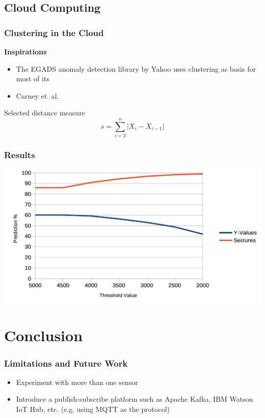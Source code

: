\documentclass[xelatex,usenames,dvipsnames]{beamer}
\begin{document}
  \subsection{Cloud Computing}
  \begin{frame}
    \frametitle{Clustering in the Cloud}
    \textbf{Inspirations}
    \begin{itemize}
      \item The \textsc{EGADS} anomaly detection library by Yahoo\cite{egads} uses clustering as basis for most of its
      \item Carney et. al.\cite{Carney2011}
    \end{itemize}
  
    \begin{exampleblock}{Selected distance measure}
      \begin{equation*}
        s = \sum_{i=2}^{n}{\left|X_i - X_{i-1}\right|}
      \end{equation*}
    \end{exampleblock}
  
  \end{frame}


  \begin{frame}[standout]
    \frametitle{Results}
  
    \includegraphics[width = \textwidth]{figs/Threshold.png}
    
  
  \end{frame}


  \section{Conclusion}
  \begin{frame}
    \frametitle{Limitations and Future Work}
    \begin{itemize}
      \item Experiment with more than one sensor
      \item Introduce a publish-subscribe platform such as Apache Kafka, IBM Watson IoT Hub, etc. (e.g. using MQTT as the protocol)
    \end{itemize}
    
  
  \end{frame}
\end{document}
